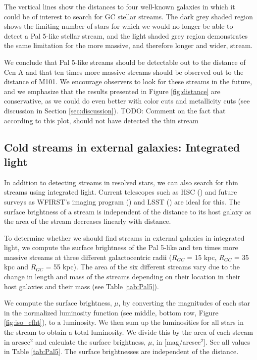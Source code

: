 \documentclass[twocolumn]{aastex62}
\newcommand{\todo}[1]{{\color{red} TODO: #1}}
\begin{document}
The vertical lines show the distances to four well-known galaxies in which it could be of interest to search for GC stellar streams. The dark grey shaded region shows the limiting number of stars for which we would no longer be able to detect a Pal 5-like stellar stream, and the light shaded grey region demonstrates the same limitation for the more massive, and therefore longer and wider, stream. 

We conclude that Pal 5-like streams should be detectable out to the distance of Cen A and that ten times more massive streams should be observed out to the distance of M101. We encourage observers to look for these streams in the future, and we emphasize that the results presented in Figure \ref{fig:distance} are conservative, as we could do even better with color cuts and metallicity cuts (see discussion in Section \ref{sec:discussion}). \todo{Comment on the fact that according to this plot, \citet{abraham18} should not have detected the thin stream}

\subsection{Cold streams in external galaxies: Integrated light}
\label{sec:integrated}
In addition to detecting streams in resolved stars, we can also search for thin streams using integrated light. Current telescopes such as HSC (\citealt{miyazaki12}) and future surveys as WFIRST's imaging program (\citealt{spergel13}) and LSST  (\citealt{ivezi08}) are ideal for this. The surface brightness of a stream is independent of the distance to its host galaxy as the area of the stream decreases linearly with distance. 

To determine whether we should find streams in external galaxies in integrated light, we compute the surface brightness of the Pal 5-like and ten times more massive streams at three different galactocentric radii ($R_{GC}$ = 15  kpc, $R_{GC}$ = 35 kpc and $R_{GC}$ = 55 kpc). The area of the six different streams vary due to the change in length and mass of the streams depending on their location in their host galaxies and their mass (see Table \ref{tab:Pal5}).

We compute the surface brightness, $\mu$, by converting the magnitudes of each star in the normalized luminosity function (see middle, bottom row, Figure \ref{fig:iso_cfht}), to a luminosity. We then sum up the luminosities for all stars in the stream to obtain a total luminosity. We divide this by the area of each stream in arcsec$^2$ and calculate the surface brightness, $\mu$, in [mag/arcsec$^2$]. See all values in Table \ref{tab:Pal5}. The surface brightnesses are independent of the distance.  
\end{document}
